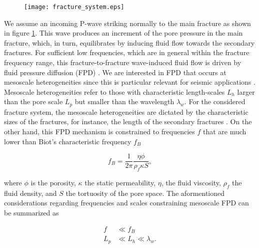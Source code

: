\documentclass[draft]{agujournal2019}
\begin{document}
 \begin{figure}[!ht]
\centering
        \texttt{[image: fracture\_system.eps]}
\caption{
}
\label{fig.1}
\end{figure}
We assume an incoming P-wave striking normally to the main fracture as shown  in figure \ref{fig.1}. This wave produces an increment of the pore pressure in the main fracture, which, in turn, equilibrates by inducing fluid flow towards the secondary fractures. For sufficient low frequencies, which are in general within the fracture frequency range, this fracture-to-fracture wave-induced fluid flow is driven by fluid pressure diffusion (FPD) \cite{Muller2010}.
We are interested in FPD that occurs at mesoscale heterogeneities since this is particular relevant for seismic applications \cite{Pride2004, Muller2010}.
Mesoscale heterogeneities refer to those with characteristic length-scales  $L_h$ larger than the pore scale $L_p$ but smaller than the wavelength $\lambda_w$. For the considered fracture system, the mesoscale heterogeneities are dictated by the characteristic sizes of the fractures, for instance, the length of the secondary fractures \cite{Rubino2014}.
On the other hand, this FPD  mechanism is constrained to frequencies $f$ that are much lower than Biot's characteristic frequency $f_B$  \cite{Biot1956, Dutta1979}
\begin{linenomath*}
\begin{equation}\label{Eq.1}
f_B= \frac{1}{2 \pi} \frac{\eta \phi}{ \rho_f \kappa S },
\end{equation}
\end{linenomath*}
where $\phi$ is the porosity, $\kappa$  the static permeability, $\eta$, the fluid viscosity,  $\rho_f$ the fluid density, and $S$ the tortuosity of the pore space. The aformentioned considerations regarding frequencies and scales constraining mesoscale FPD can be summarized as
\begin{linenomath*}
\begin{equation}\label{Eq.2}
\begin{split}
f & \ll f_B\\
L_p & \ll L_h\ll \lambda_w.
\end{split}
\end{equation}
\end{linenomath*}
\end{document}
